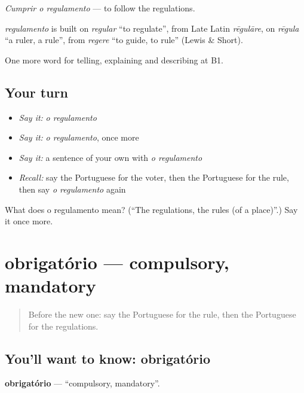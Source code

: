 \emph{Cumprir o regulamento} — to follow the regulations.

\begin{cousinweb}
\emph{regulamento} is built on \emph{regular} \textquotedblleft{}to regulate\textquotedblright{}, from Late Latin \emph{rēgulāre}, on \emph{rēgula} \textquotedblleft{}a ruler, a rule\textquotedblright{}, from \emph{regere} \textquotedblleft{}to guide, to rule\textquotedblright{} (Lewis \& Short).
\end{cousinweb}

\begin{grammarlens}[title={What you've built}]
One more word for telling, explaining and describing at B1.
\end{grammarlens}

\subsection*{Your turn}
\begin{itemize}
\raggedright
  \item \emph{Say it:} \emph{o regulamento}
  \item \emph{Say it:} \emph{o regulamento}, once more
  \item \emph{Say it:} a sentence of your own with \emph{o regulamento}
  \item \emph{Recall:} say the Portuguese for the voter, then the Portuguese for the rule, then say \emph{o regulamento} again
\end{itemize}

\begin{tcolorbox}[breakable,colback=teal!4,colframe=teal!35!black,title={Before you move on}]
What does o regulamento mean? (\textquotedblleft{}The regulations, the rules (of a place)\textquotedblright{}.) Say it once more.
\end{tcolorbox}
\section[obrigatório]{obrigatório — compulsory, mandatory}

\label{lesson:PT-C381-obrigatorio}



\begin{quote}
Before the new one: say the Portuguese for the rule, then the Portuguese for the regulations.
\end{quote}

\subsection*{You'll want to know: obrigatório}
\textbf{obrigatório} — \textquotedblleft{}compulsory, mandatory\textquotedblright{}.

